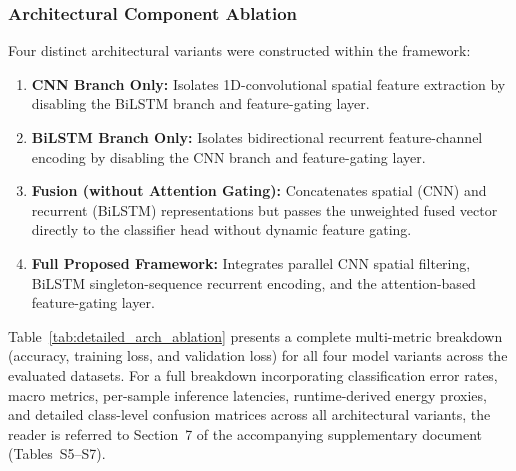 \documentclass[a4paper,fleqn]{cas-sc}
\begin{document}
\subsubsection{Architectural Component Ablation}
Four distinct architectural variants were constructed within the framework:
\begin{enumerate}
    \item \textbf{CNN Branch Only:} Isolates 1D-convolutional spatial feature extraction by disabling the BiLSTM branch and feature-gating layer.
    \item \textbf{BiLSTM Branch Only:} Isolates bidirectional recurrent feature-channel encoding by disabling the CNN branch and feature-gating layer.
    \item \textbf{Fusion (without Attention Gating):} Concatenates spatial (CNN) and recurrent (BiLSTM) representations but passes the unweighted fused vector directly to the classifier head without dynamic feature gating.
    \item \textbf{Full Proposed Framework:} Integrates parallel CNN spatial filtering, BiLSTM singleton-sequence recurrent encoding, and the attention-based feature-gating layer.
\end{enumerate}

Table~\ref{tab:detailed_arch_ablation} presents a complete multi-metric breakdown (accuracy, training loss, and validation loss) for all four model variants across the evaluated datasets. For a full breakdown incorporating classification error rates, macro metrics, per-sample inference latencies, runtime-derived energy proxies, and detailed class-level confusion matrices across all architectural variants, the reader is referred to Section~7 of the accompanying supplementary document (Tables~S5--S7).
\end{document}
